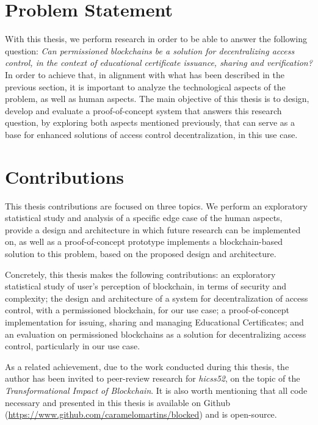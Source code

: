 \section{Problem Statement}

With this thesis, we perform research in order to be able to answer the following question: \textit{Can permissioned blockchains be a solution for decentralizing access control, in the context of educational certificate issuance, sharing and verification?} In order to achieve that, in alignment with what has been described in the previous section, it is important to analyze the technological aspects of the problem, as well as human aspects.  The main objective of this thesis is to design, develop and evaluate a proof-of-concept system that answers this research question, by exploring both aspects mentioned previously, that can serve as a base for enhanced solutions of access control decentralization, in this use case.

\section{Contributions}
\label{sec:contributions}

This thesis contributions are focused on three topics. We perform an exploratory statistical study and analysis of a specific edge case of the human aspects, provide a design and architecture in which future research can be implemented on, as well as a proof-of-concept prototype implements a blockchain-based solution to this problem, based on the proposed design and architecture.

Concretely, this thesis makes the following contributions: an exploratory statistical study of user's perception of blockchain, in terms of security and complexity; the design and architecture of a system for decentralization of access control, with a permissioned blockchain, for our use case; a proof-of-concept implementation for issuing, sharing and managing Educational Certificates; and an evaluation on permissioned blockchains as a solution for decentralizing access control, particularly in our use case.

As a related achievement, due to the work conducted during this thesis, the author has been invited to peer-review research for \textit{\glsdesc{hicss52}}, on the topic of the \textit{Transformational Impact of Blockchain}. It is also worth mentioning that all code necessary and presented in this thesis is available on Github (\url{https://www.github.com/caramelomartins/blocked}) and is open-source.

